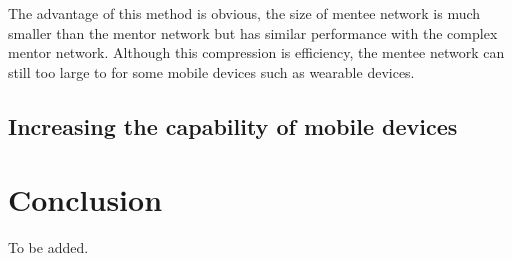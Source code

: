 \documentclass[article]{aaltoseries}
\begin{document}
The advantage of this method is obvious, 
the size of mentee network is much smaller than the mentor network but has similar performance
with the complex mentor network. 
Although this compression is efficiency, the mentee network can still too large to for some mobile
devices such as wearable devices.


\subsection{Increasing the capability of mobile devices}








\section{Conclusion}

To be added.






\end{document}
